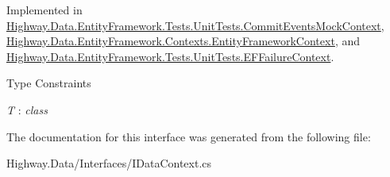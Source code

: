 Implemented in \hyperlink{class_highway_1_1_data_1_1_entity_framework_1_1_tests_1_1_unit_tests_1_1_commit_events_mock_context_aa642060835ad2e1a58acb568c2a7c879}{Highway.\-Data.\-Entity\-Framework.\-Tests.\-Unit\-Tests.\-Commit\-Events\-Mock\-Context}, \hyperlink{class_highway_1_1_data_1_1_entity_framework_1_1_contexts_1_1_entity_framework_context_a3746422e9f70039d208c6dd6be02327e}{Highway.\-Data.\-Entity\-Framework.\-Contexts.\-Entity\-Framework\-Context}, and \hyperlink{class_highway_1_1_data_1_1_entity_framework_1_1_tests_1_1_unit_tests_1_1_e_f_failure_context_a2a82171e665c27272dd5814deb80aa89}{Highway.\-Data.\-Entity\-Framework.\-Tests.\-Unit\-Tests.\-E\-F\-Failure\-Context}.

\begin{Desc}
\item[Type Constraints]\begin{description}
\item[{\em T} : {\em class}]\end{description}
\end{Desc}


The documentation for this interface was generated from the following file\-:\begin{DoxyCompactItemize}
\item 
Highway.\-Data/\-Interfaces/I\-Data\-Context.\-cs\end{DoxyCompactItemize}
